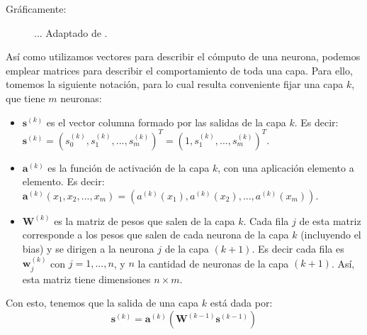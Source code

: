 \documentclass[../../main.tex]{subfiles}
\begin{document}
Gráficamente:
\begin{figure}[ht]
    \centering
    \caption{... Adaptado de \cite{tikz-neural-networks}.}
    \label{}
\end{figure}


Así como utilizamos vectores para describir el cómputo de una neurona, podemos emplear
matrices para describir el comportamiento de toda una capa. Para ello, tomemos la siguiente
notación, para lo cual resulta conveniente fijar una capa \(k\), que tiene \(m\)
neuronas:
\begin{itemize}[itemsep=0.1cm]
    \item \(\bm{s}^{(k)}\) es el vector columna formado por las salidas de la capa
    \(k\). Es decir: \(\bm{s}^{(k)} = (s_0^{(k)}, s_1^{(k)}, ..., s_m^{(k)})^T = (1,
    s_1^{(k)}, ..., s_m^{(k)})^T\).
    \item \(\bm{a}^{(k)}\) es la función de activación de la capa \(k\), con una aplicación
    elemento a elemento. Es decir: \(\bm{a}^{(k)}(x_1, x_2, ..., x_m) = (a^{(k)}(x_1),
    a^{(k)}(x_2), ..., a^{(k)}(x_m))\).
    \item \(\mathbf{W}^{(k)}\) es la matriz de pesos que salen de la capa \(k\). Cada fila
    \(j\) de esta matriz corresponde a los pesos que salen de cada neurona de la capa
    \(k\) (incluyendo el bias) y se dirigen a la neurona \(j\) de la capa \((k+1)\). Es
    decir cada fila es \(\bm{w}^{(k)}_j\) con \(j = 1,...,n\), y \(n\) la cantidad de
    neuronas de la capa \((k+1)\). Así, esta matriz tiene dimensiones \(n \times m\).
\end{itemize}
Con esto, tenemos que la salida de una capa \(k\) está dada por:
\[
    \bm{s}^{(k)} = \bm{a}^{(k)} \left( \mathbf{W}^{(k-1)} \bm{s}^{(k-1)} \right)
\]
\end{document}
